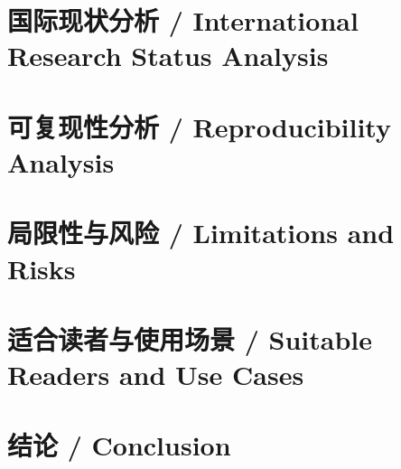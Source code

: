 \documentclass[11pt]{article}
\begin{document}
\section{国际现状分析 / International Research Status Analysis}

\section{可复现性分析 / Reproducibility Analysis}

\section{局限性与风险 / Limitations and Risks}

\section{适合读者与使用场景 / Suitable Readers and Use Cases}

\section{结论 / Conclusion}
\end{document}
